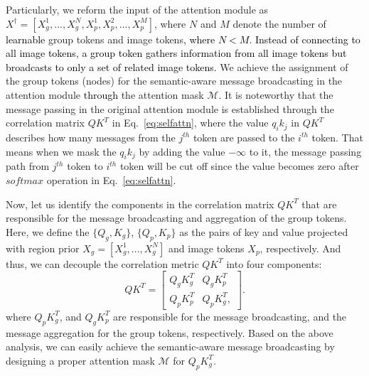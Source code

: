 \documentclass[journal]{IEEEtran}
\newcommand{\tcb}{\textcolor{black}}
\begin{document}
Particularly, we reform the input of the attention module as $X^\dagger = [X_g^1, ..., X_g^N, X_p^1, X_p^2, ..., X_p^M]$, where $N$ and $M$ denote the number of \tcb{learnable} group tokens and image tokens\tcb{, where $N < M$}.
\tcb{Instead of connecting to all image tokens, a group token gathers information from all image tokens but broadcasts to only a set of related image tokens.} 
We achieve the assignment of the group tokens (nodes) for the semantic-aware message broadcasting in the attention module \tcb{through} the attention mask $\mathcal{M}$. It is noteworthy that the message passing in the original attention module is established through the correlation matrix $QK^T$ in Eq.~\ref{eq:selfattn}, where the value $q_ik_j$ in $QK^T$ describes how many messages from the $j^{th}$ token are passed to the $i^{th}$ token. That means when we mask the $q_ik_j$ by adding the value $-\infty$ to it, the message passing path from $j^{th}$ token to $i^{th}$ token will be cut off since the value becomes zero after $softmax$ operation in Eq.~\ref{eq:selfattn}. 

Now, let us identify the components in the correlation matrix $QK^T$ that are responsible for the message broadcasting and aggregation of the group tokens. Here, we define the $\{Q_g, K_g\}$,  $\{Q_p, K_p\}$ as the pairs of key and value projected with region prior $X_g=[X_g^1, ..., X_g^N]$ and image tokens $X_p$, respectively. And thus, we can decouple the correlation metric $QK^T$ into four components:
\begin{equation}
    QK^T= \begin{bmatrix}
 Q_g K_g^T & Q_g K_p^T \\
  Q_p K_p^T & Q_p K_g^T,
  \end{bmatrix}.
  \label{equ:corrematrix}
\end{equation}
where $Q_pK_g^T$, and $Q_gK_p^T$ are responsible for the message broadcasting, and the message aggregation for the group tokens, respectively. Based on the above analysis, we can easily achieve the semantic-aware message broadcasting by designing a proper attention mask $\mathcal{M}$ for $Q_pK_g^T$. 
\end{document}
